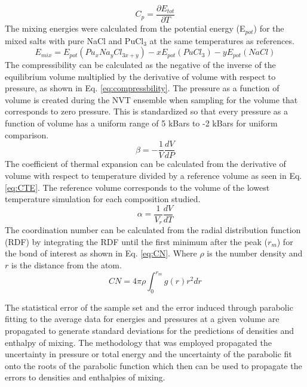 \documentclass[review]{elsarticle}
\begin{document}
\begin{equation}
  \label{eq:cp}
     C_p = \frac{\partial E_{tot}}{\partial T}
\end{equation}
The mixing energies were calculated from the potential energy (E$_{pot}$) for the mixed salts with pure NaCl and PuCl$_3$ at the same temperatures as references.
\begin{equation}
  \label{eq:mixing_energy}
     E_{mix} = E_{pot}(Pu_{x}Na_{y}Cl_{3x+y}) - xE_{pot}(PuCl_3) - yE_{pot}(NaCl)
\end{equation}
The compressibility can be calculated as the negative of the inverse of the equilibrium volume multiplied by the derivative of volume with respect to pressure, as shown in Eq. \ref{eq:compressbility}. The pressure as a function of volume is created during the NVT ensemble when sampling for the volume that corresponds to zero pressure. This is standardized so that every pressure as a function of volume has a uniform range of 5 kBars to -2 kBars for uniform comparison.
\begin{equation}
  \label{eq:compressbility}
    \beta = -\frac{1}{V}\frac{dV}{dP}
\end{equation}
The coefficient of thermal expansion can be calculated from the derivative of volume with respect to temperature divided by a reference volume as seen in Eq. \ref{eq:CTE}. The reference volume corresponds to the volume of the lowest temperature simulation for each composition studied. 
\begin{equation}
 \label{eq:CTE}
   \alpha = \frac{1}{V_{r}}\frac{dV}{dT}
\end{equation}
The coordination number can be calculated from the radial distribution function (RDF) by integrating the RDF until the first minimum after the peak ($r_m$) for the bond of interest as shown in Eq. \ref{eq:CN}. Where $\rho$ is the number density and $r$ is the distance from the atom. 
\begin{equation}
    \label{eq:CN}
   CN =4\pi \rho \int_0^{r_m} g(r) r^2 dr
\end{equation}

The statistical error of the sample set and the error induced through parabolic fitting to the average data for energies and pressures at a given volume are propagated to generate standard deviations for the predictions of densities and enthalpy of mixing. The methodology that was employed propagated the uncertainty in pressure or total energy and the uncertainty of the parabolic fit onto the roots of the parabolic function which then can be used to propagate the errors to densities and enthalpies of mixing.
\end{document}
